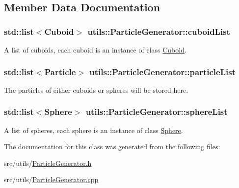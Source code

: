\subsection{Member Data Documentation}
\hypertarget{classutils_1_1ParticleGenerator_a2b4d4491fa74e20a23f7affc96de834a}{
\subsubsection[{cuboid\-List}]{\setlength{\rightskip}{0pt plus 5cm}std\-::list$<${\bf Cuboid}$>$ utils\-::\-Particle\-Generator\-::cuboid\-List\hspace{0.3cm}{\ttfamily [private]}}}\label{classutils_1_1ParticleGenerator_a2b4d4491fa74e20a23f7affc96de834a}
A list of cuboids, each cuboid is an instance of class \hyperlink{classCuboid}{Cuboid}. \hypertarget{classutils_1_1ParticleGenerator_a83e8886303b0e6d0e1b269cb54e7d04b}{
\subsubsection[{particle\-List}]{\setlength{\rightskip}{0pt plus 5cm}std\-::list$<${\bf Particle}$>$ utils\-::\-Particle\-Generator\-::particle\-List\hspace{0.3cm}{\ttfamily [private]}}}\label{classutils_1_1ParticleGenerator_a83e8886303b0e6d0e1b269cb54e7d04b}
The particles of either cuboids or spheres will be stored here. \hypertarget{classutils_1_1ParticleGenerator_a51b9b7685b429b44bd889a9b62b25ec2}{
\subsubsection[{sphere\-List}]{\setlength{\rightskip}{0pt plus 5cm}std\-::list$<${\bf Sphere}$>$ utils\-::\-Particle\-Generator\-::sphere\-List\hspace{0.3cm}{\ttfamily [private]}}}\label{classutils_1_1ParticleGenerator_a51b9b7685b429b44bd889a9b62b25ec2}
A list of spheres, each sphere is an instance of class \hyperlink{classSphere}{Sphere}. 

The documentation for this class was generated from the following files\-:\begin{DoxyCompactItemize}
\item 
src/utils/\hyperlink{ParticleGenerator_8h}{Particle\-Generator.\-h}\item 
src/utils/\hyperlink{ParticleGenerator_8cpp}{Particle\-Generator.\-cpp}\end{DoxyCompactItemize}
